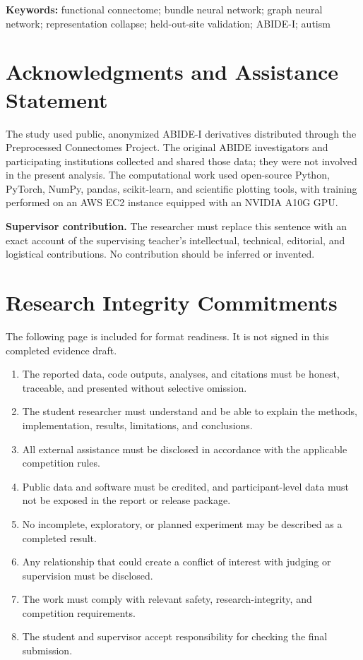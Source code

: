 \documentclass[11pt,a4paper]{article}
\begin{document}
\noindent\textbf{Keywords:} functional connectome; bundle neural network;
graph neural network; representation collapse; held-out-site validation;
ABIDE-I; autism

\clearpage
\section*{Acknowledgments and Assistance Statement}

The study used public, anonymized ABIDE-I derivatives distributed through the
Preprocessed Connectomes Project. The original ABIDE investigators and
participating institutions collected and shared those data; they were not
involved in the present analysis. The computational work used open-source
Python, PyTorch, NumPy, pandas, scikit-learn, and scientific plotting tools,
with training performed on an AWS EC2 instance equipped with an NVIDIA A10G
GPU.

\noindent\textbf{Supervisor contribution.} The researcher must replace this
sentence with an exact account of the supervising teacher's intellectual,
technical, editorial, and logistical contributions. No contribution should be
inferred or invented.

\clearpage
\section*{Research Integrity Commitments}

The following page is included for format readiness. It is not signed in this
completed evidence draft.

\begin{enumerate}[label=\arabic*.,leftmargin=2.2em]
  \item The reported data, code outputs, analyses, and citations must be honest,
  traceable, and presented without selective omission.
  \item The student researcher must understand and be able to explain the
  methods, implementation, results, limitations, and conclusions.
  \item All external assistance must be disclosed in
  accordance with the applicable competition rules.
  \item Public data and software must be credited, and participant-level data
  must not be exposed in the report or release package.
  \item No incomplete, exploratory, or planned experiment may be described as a
  completed result.
  \item Any relationship that could create a conflict of interest with judging
  or supervision must be disclosed.
  \item The work must comply with relevant safety, research-integrity, and
  competition requirements.
  \item The student and supervisor accept responsibility for checking the final
  submission.
\end{enumerate}
\end{document}
